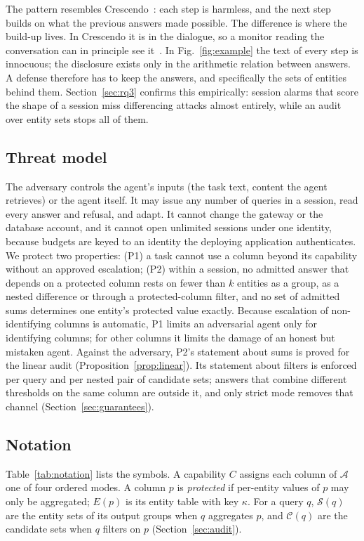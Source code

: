 \documentclass[10pt,journal,compsoc]{IEEEtran}
\begin{document}
The pattern resembles Crescendo~\cite{russinovich2025crescendo}: each step is harmless, and the next step builds on what the previous answers made possible. The difference is where the build-up lives. In Crescendo it is in the dialogue, so a monitor reading the conversation can in principle see it~\cite{chen2025sequential}. In Fig.~\ref{fig:example} the text of every step is innocuous; the disclosure exists only in the arithmetic relation between answers. A defense therefore has to keep the answers, and specifically the sets of entities behind them. Section~\ref{sec:rq3} confirms this empirically: session alarms that score the shape of a session miss differencing attacks almost entirely, while an audit over entity sets stops all of them.

\subsection{Threat model}
The adversary controls the agent's inputs (the task text, content the agent retrieves) or the agent itself. It may issue any number of queries in a session, read every answer and refusal, and adapt. It cannot change the gateway or the database account, and it cannot open unlimited sessions under one identity, because budgets are keyed to an identity the deploying application authenticates. We protect two properties: (P1) a task cannot use a column beyond its capability without an approved escalation; (P2) within a session, no admitted answer that depends on a protected column rests on fewer than $k$ entities as a group, as a nested difference or through a protected-column filter, and no set of admitted sums determines one entity's protected value exactly. Because escalation of non-identifying columns is automatic, P1 limits an adversarial agent only for identifying columns; for other columns it limits the damage of an honest but mistaken agent. Against the adversary, P2's statement about sums is proved for the linear audit (Proposition~\ref{prop:linear}). Its statement about filters is enforced per query and per nested pair of candidate sets; answers that combine different thresholds on the same column are outside it, and only strict mode removes that channel (Section~\ref{sec:guarantees}).

\subsection{Notation}
Table~\ref{tab:notation} lists the symbols. A capability $C$ assigns each column of $\mathcal{A}$ one of four ordered modes. A column $p$ is \emph{protected} if per-entity values of $p$ may only be aggregated; $E(p)$ is its entity table with key $\kappa$. For a query $q$, $\mathcal{S}(q)$ are the entity sets of its output groups when $q$ aggregates $p$, and $\mathcal{C}(q)$ are the candidate sets when $q$ filters on $p$ (Section~\ref{sec:audit}).
\end{document}
